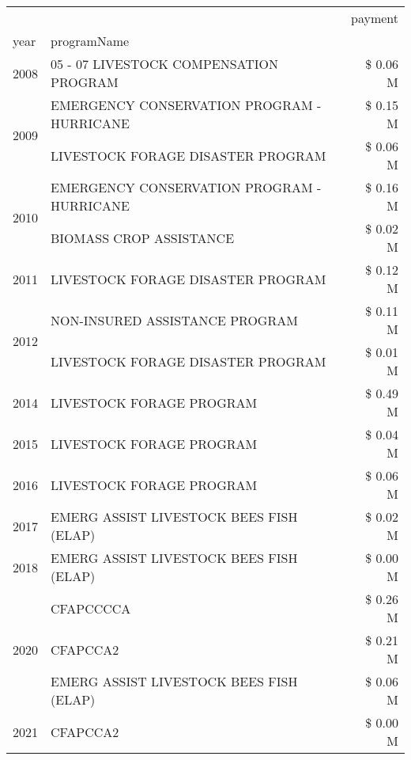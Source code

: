 \begin{tabular}{llr}
\toprule
 &  & payment \\
year & programName &  \\
\midrule
2008 & 05 - 07 LIVESTOCK COMPENSATION PROGRAM & \$ 0.06 M \\
\cline{1-3}
\multirow[t]{2}{*}{2009} & EMERGENCY CONSERVATION PROGRAM - HURRICANE & \$ 0.15 M \\
 & LIVESTOCK FORAGE DISASTER  PROGRAM & \$ 0.06 M \\
\cline{1-3}
\multirow[t]{2}{*}{2010} & EMERGENCY CONSERVATION PROGRAM - HURRICANE & \$ 0.16 M \\
 & BIOMASS CROP ASSISTANCE & \$ 0.02 M \\
\cline{1-3}
2011 & LIVESTOCK FORAGE DISASTER PROGRAM & \$ 0.12 M \\
\cline{1-3}
\multirow[t]{2}{*}{2012} & NON-INSURED ASSISTANCE PROGRAM & \$ 0.11 M \\
 & LIVESTOCK FORAGE DISASTER PROGRAM & \$ 0.01 M \\
\cline{1-3}
2014 & LIVESTOCK FORAGE PROGRAM & \$ 0.49 M \\
\cline{1-3}
2015 & LIVESTOCK FORAGE PROGRAM & \$ 0.04 M \\
\cline{1-3}
2016 & LIVESTOCK FORAGE PROGRAM & \$ 0.06 M \\
\cline{1-3}
2017 & EMERG ASSIST LIVESTOCK BEES FISH (ELAP) & \$ 0.02 M \\
\cline{1-3}
2018 & EMERG ASSIST LIVESTOCK BEES FISH (ELAP) & \$ 0.00 M \\
\cline{1-3}
\multirow[t]{3}{*}{2020} & CFAPCCCCA & \$ 0.26 M \\
 & CFAPCCA2 & \$ 0.21 M \\
 & EMERG ASSIST LIVESTOCK BEES FISH (ELAP) & \$ 0.06 M \\
\cline{1-3}
2021 & CFAPCCA2 & \$ 0.00 M \\
\cline{1-3}
\bottomrule
\end{tabular}
